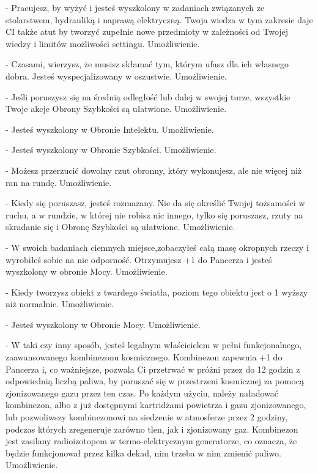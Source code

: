 { - Pracujesz, by wyżyć i jesteś wyszkolony w zadaniach związanych ze stolarstwem, hydrauliką i naprawą elektryczną. Twoja wiedza w tym zakresie daje CI także atut by tworzyć zupełnie nowe przedmioty w zależności od Twojej wiedzy i limitów możliwości settingu. Umożliwienie.

 - Czasami, wierzysz, że musisz skłamać tym, którym ufasz dla ich własnego dobra. Jesteś wyspecjalizowany w oszustwie. Umożliwienie.

 - Jeśli poruszysz się na średnią odległość lub dalej w swojej turze, wszystkie Twoje akcje Obrony Szybkości są ułatwione. Umożliwienie.

 - Jesteś wyszkolony w Obronie Intelektu. Umożliwienie.

 - Jesteś wyszkolony w Obronie Szybkości. Umożliwienie.

 - Możesz przerzucić dowolny rzut obronny, który wykonujesz, ale nie więcej niż ran na rundę. Umożliwienie.

 - Kiedy się poruszasz, jesteś rozmazany. Nie da się określić Twojej tożsamości w ruchu, a w rundzie, w której nie robisz nic innego, tylko się poruszasz, rzuty na skradanie się i Obronę Szybkości są ułatwione. Umożliwienie.

 - W swoich badaniach ciemnych miejsce,zobaczyłeś całą masę okropnych rzeczy i wyrobiłeś sobie na nie odporność. Otrzymujesz +1 do Pancerza i jesteś wyszkolony w obronie Mocy. Umożliwienie. 

 - Kiedy tworzysz obiekt z twardego światła, poziom tego obiektu jest o 1 wyższy niż normalnie. Umożliwienie.

 - Jesteś wyszkolony w Obronie Mocy. Umożliwienie.

 - W taki czy inny sposób, jesteś legalnym właścicielem w pełni funkcjonalnego, zaawansowanego kombinezonu kosmicznego. Kombinezon zapewnia +1 do Pancerza i, co ważniejsze, pozwala Ci przetrwać w próżni przez do 12 godzin z odpowiednią liczbą paliwa, by poruszać się w przestrzeni kosmicznej za pomocą zjonizowanego gazu przez ten czas. Po każdym użyciu, należy naładować kombinezon, albo z już dostępnymi kartridżami powietrza i gazu zjonizowanego, lub pozwoliwszy kombinezonowi na siedzenie w atmosferze przez 2 godziny, podczas których zregeneruje zarówno tlen, jak i zjonizowany gaz. Kombinezon jest zasilany radioizotopem w termo-elektrycznym generatorze, co oznacza, że będzie funkcjonował przez kilka dekad, nim trzeba w nim zmienić paliwo. Umożliwienie. 

}
